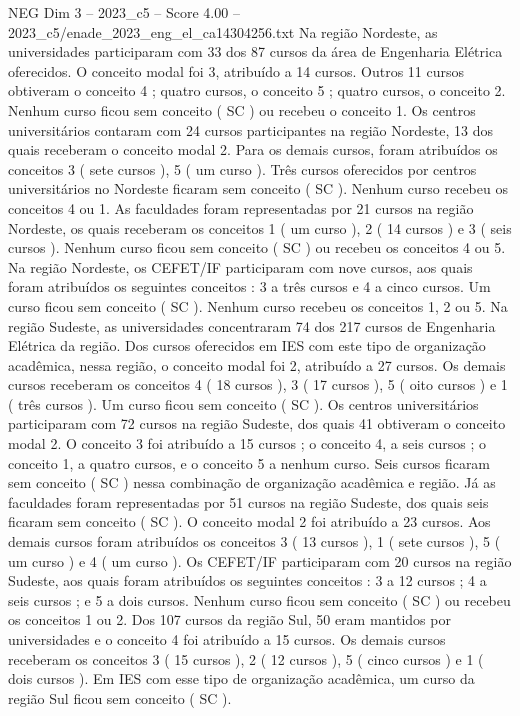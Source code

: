 \begin{textsample}{NEG Dim 3 – 2023\_c5 – Score 4.00 – 2023\_c5/enade\_2023\_eng\_el\_ca14304256.txt}
Na região Nordeste, as universidades participaram com 33 dos 87 cursos da área de Engenharia Elétrica oferecidos.
O conceito modal foi 3, atribuído a 14 cursos.
Outros 11 cursos obtiveram o conceito 4 ; quatro cursos, o conceito 5 ; quatro cursos, o conceito 2.
Nenhum curso ficou sem conceito ( SC ) ou recebeu o conceito 1.
Os centros universitários contaram com 24 cursos participantes na região Nordeste, 13 dos quais receberam o conceito modal 2.
Para os demais cursos, foram atribuídos os conceitos 3 ( sete cursos ), 5 ( um curso ).
Três cursos oferecidos por centros universitários no Nordeste ficaram sem conceito ( SC ).
Nenhum curso recebeu os conceitos 4 ou 1.
As faculdades foram representadas por 21 cursos na região Nordeste, os quais receberam os conceitos 1 ( um curso ), 2 ( 14 cursos ) e 3 ( seis cursos ).
Nenhum curso ficou sem conceito ( SC ) ou recebeu os conceitos 4 ou 5.
Na região Nordeste, os CEFET/IF participaram com nove cursos, aos quais foram atribuídos os seguintes conceitos : 3 a três cursos e 4 a cinco cursos.
Um curso ficou sem conceito ( SC ).
Nenhum curso recebeu os conceitos 1, 2 ou 5.
Na região Sudeste, as universidades concentraram 74 dos 217 cursos de Engenharia Elétrica da região.
Dos cursos oferecidos em IES com este tipo de organização acadêmica, nessa região, o conceito modal foi 2, atribuído a 27 cursos.
Os demais cursos receberam os conceitos 4 ( 18 cursos ), 3 ( 17 cursos ), 5 ( oito cursos ) e 1 ( três cursos ).
Um curso ficou sem conceito ( SC ).
Os centros universitários participaram com 72 cursos na região Sudeste, dos quais 41 obtiveram o conceito modal 2.
O conceito 3 foi atribuído a 15 cursos ; o conceito 4, a seis cursos ; o conceito 1, a quatro cursos, e o conceito 5 a nenhum curso.
Seis cursos ficaram sem conceito ( SC ) nessa combinação de organização acadêmica e região.
Já as faculdades foram representadas por 51 cursos na região Sudeste, dos quais seis ficaram sem conceito ( SC ).
O conceito modal 2 foi atribuído a 23 cursos.
Aos demais cursos foram atribuídos os conceitos 3 ( 13 cursos ), 1 ( sete cursos ), 5 ( um curso ) e 4 ( um curso ).
Os CEFET/IF participaram com 20 cursos na região Sudeste, aos quais foram atribuídos os seguintes conceitos : 3 a 12 cursos ; 4 a seis cursos ; e 5 a dois cursos.
Nenhum curso ficou sem conceito ( SC ) ou recebeu os conceitos 1 ou 2.
Dos 107 cursos da região Sul, 50 eram mantidos por universidades e o conceito 4 foi atribuído a 15 cursos.
Os demais cursos receberam os conceitos 3 ( 15 cursos ), 2 ( 12 cursos ), 5 ( cinco cursos ) e 1 ( dois cursos ).
Em IES com esse tipo de organização acadêmica, um curso da região Sul ficou sem conceito ( SC ).

\end{textsample}
